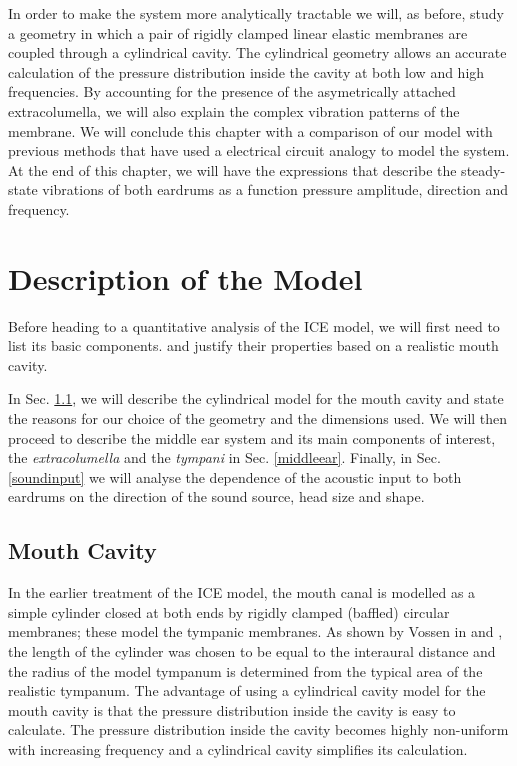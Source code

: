 In order to make the system more analytically tractable we will, as before, study a geometry in which a pair of rigidly clamped
linear elastic membranes are coupled through a cylindrical cavity. The cylindrical geometry allows an accurate calculation of the 
pressure distribution inside the cavity at both low and high frequencies. By accounting for the presence of the asymetrically attached
extracolumella, we will also explain the complex vibration patterns of the membrane. We will conclude this chapter
with a comparison of our model with previous methods that have used a electrical circuit analogy to model the system. At the end of this chapter, we will
have the expressions that describe the steady-state vibrations of both eardrums as a function pressure amplitude, direction and frequency.

\section{Description of the Model}\label{description}
Before heading to a quantitative analysis of the ICE model, we will first need to list its basic components. 
and justify their properties based on a realistic mouth cavity. 

In Sec. \ref{subsecinnercavity}, we will describe the cylindrical model for the mouth cavity and state the reasons
for our choice of the geometry and the dimensions used. We will then proceed to describe the middle
ear system and its main components of interest, the \textit{extracolumella} and the \textit{tympani}
in Sec. \ref{middleear}. Finally, in Sec. \ref{soundinput} we will analyse the dependence of the acoustic input to both
eardrums on the direction of the sound source, head size and shape. 
\subsection{Mouth Cavity}\label{subsecinnercavity}
In the earlier treatment of the ICE model, the mouth canal is modelled as a simple cylinder closed at 
both ends by rigidly clamped (baffled) circular membranes; these model the tympanic membranes. As shown 
by Vossen in \cite[p.~21]{vossenthesis} and \cite{vossenjasa}, the length of the cylinder was chosen to be equal to the interaural distance and the radius of the model tympanum is
determined from the typical area of the realistic tympanum. The advantage of using a cylindrical cavity model for the mouth cavity is that the pressure
distribution inside the cavity is easy to calculate. The pressure distribution inside the cavity becomes highly non-uniform 
with increasing frequency and a cylindrical cavity simplifies its calculation. 

